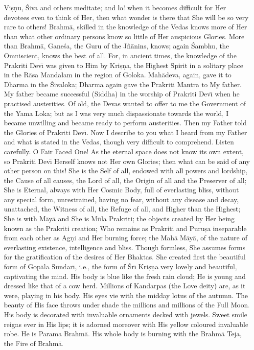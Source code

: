 Vi\d{s}\d{n}u, \'Siva and others meditate; and lo! when it becomes difficult for Her devotees even to think of Her, then what wonder is there that She will be so very rare to others! Brahm\=a, skilled in the knowledge of the Vedas knows more of Her than what other ordinary persons know so little of Her auspicious Glories. More than Brahm\=a, Gane\'sa, the Guru of the J\~n\=anins, knows; again \'Sambhu, the Omniscient, knows the best of all. For, in ancient times, the knowledge of the Prakriti Dev\={\i} was given to Him by Kri\d{s}\d{n}a, the Highest Spirit in a solitary place in the R\=asa Mandalam in the region of Goloka. Mah\=adeva, again, gave it to Dharma in the \'Sivaloka; Dharma again gave the Prakriti Mantra to My father. My father became successful (Siddha) in the worship of Prakriti Dev\={\i} when he practised austerities. Of old, the Devas wanted to offer to me the Government of the Yama Loka; but as I was very much dispassionate towards the world, I became unwilling and became ready to perform austerities. Then my Father told the Glories of Prakriti Dev\={\i}. Now I describe to you what I heard from my Father and what is stated in the Vedas, though very difficult to comprehend. Listen carefully. O Fair Faced One! As the eternal space does not know its own extent, so Prakriti Dev\={\i} Herself knows not Her own Glories; then what can be said of any other person on this! She is the Self of all, endowed with all powers and lordship, the Cause of all causes, the Lord of all, the Origin of all and the Preserver of all; She is Eternal, always with Her Cosmic Body, full of everlasting bliss, without any special form, unrestrained, having no fear, without any disease and decay, unattached, the Witness of all, the Refuge of all, and Higher than the Highest; She is with M\=ay\=a and She is M\=ula Prakriti; the objects created by Her being known as the Prakriti creation; Who remains as Prakriti and Puru\d{s}a inseparable from each other as Ag\d{n}i and Her burning force; the Mah\=a M\=ay\=a, of the nature of everlasting existence, intelligence and bliss. Though formless, She assumes forms for the gratification of the desires of Her Bhaktas. She created first the beautiful form of Gop\=ala Sundar\={\i}, i.e., the form of \'Sr\={\i} Kri\d{s}\d{n}a very lovely and beautiful, captivating the mind. His body is blue like the fresh rain cloud; He is young and dressed like that of a cow herd. Millions of Kandarpas (the Love deity) are, as it were, playing in his body. His eyes vie with the midday lotus of the autumn. The beauty of His face throws under shade the millions and millions of the Full Moon. His body is decorated with invaluable ornaments decked with jewels. Sweet smile reigns ever in His lips; it is adorned moreover with His yellow coloured invaluable robe. He is Parama Brahm\=a. His whole body is burning with the Brahm\=a Teja, the Fire of Brahm\=a.

